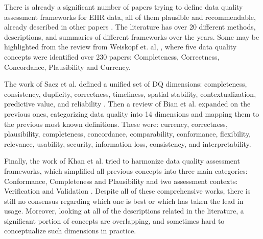 There is already a significant number of papers trying to define data quality assessment frameworks for EHR data, all of them plausible and recommendable, already described in other papers \cite{bianAssessingPracticeData2020}. The literature has over 20 different methods, descriptions, and summaries of  different frameworks over the years. Some may be highlighted from the review from Weiskopf et. al, \cite{weiskopfMethodsDimensionsElectronic2013}, where five data quality concepts were identified over 230 papers: Completeness, Correctness, Concordance, Plausibility and Currency. 



The work of Saez et al. defined a unified set of DQ dimensions: completeness, consistency, duplicity, correctness, timeliness, spatial stability, contextualization, predictive value, and reliability \cite{}. Then a review of Bian et al. \cite{bianAssessingPracticeData2020} expanded on the previous ones, categorizing data quality into 14 dimensions and mapping them to the previous most known definitions. These were: currency, correctness, plausibility, completeness, concordance, comparability, conformance, flexibility, relevance, usability, security, information loss, consistency, and interpretability.

Finally, the work of Khan et al. tried to harmonize data quality assessment frameworks, which simplified all previous concepts into three main categories: Conformance, Completeness and Plausibility and two assessment contexts: Verification and Validation \cite{kahnHarmonizedDataQuality2016a}.
Despite all of these comprehensive works, there is still no consensus regarding which one is best or which has taken the lead in usage. Moreover, looking at all of the descriptions related in the literature, a significant portion of concepts are overlapping, and sometimes hard to conceptualize such dimensions in practice.

